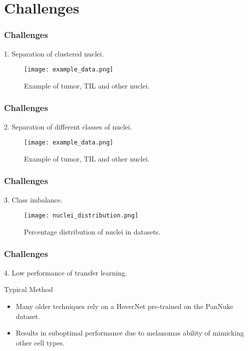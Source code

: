 \documentclass[../main.tex]{subfiles}
\begin{document}
\section{Challenges}
\begin{frame}[c]
    \frametitle{Challenges}
    1. Separation of clustered nuclei.

    \begin{figure}
        \centering
        \texttt{[image: example\_data.png]}
        \caption{Example of tumor, TIL and other nuclei.}
    \end{figure}
\end{frame}

\begin{frame}[c]
    \frametitle{Challenges}
    2. Separation of different classes of nuclei.

    \begin{figure}
        \centering
        \texttt{[image: example\_data.png]}
        \caption{Example of tumor, TIL and other nuclei.}
    \end{figure}
\end{frame}

\begin{frame}[c]
    \frametitle{Challenges}
    3. Class imbalance.

    \begin{figure}
        \centering
        \texttt{[image: nuclei\_distribution.png]}
        \caption{Percentage distribution of nuclei in datasets.}
    \end{figure}
\end{frame}

\begin{frame}[c]
    \frametitle{Challenges}
    4. Low performance of transfer learning.

    \begin{block}{Typical Method}
        \begin{itemize}
            \item Many older techniques rely on a HoverNet pre-trained on the PanNuke dataset.
            \item Results in suboptimal performance due to melanomas ability of mimicking other cell types.
        \end{itemize}
    \end{block}
\end{frame}
\end{document}
